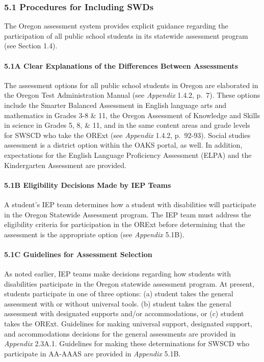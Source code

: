 \documentclass[]{article}
\let\oldparagraph\paragraph
\renewcommand{\paragraph}[1]{\oldparagraph{#1}\mbox{}}
\begin{document}
\subsubsection{5.1 Procedures for Including
SWDs}\label{procedures-for-including-swds}

The Oregon assessment system provides explicit guidance regarding the
participation of all public school students in its statewide assessment
program (see Section 1.4).

\paragraph{5.1A Clear Explanations of the Differences Between
Assessments}\label{a-clear-explanations-of-the-differences-between-assessments}

The assessment options for all public school students in Oregon are
elaborated in the Oregon Test Administration Manual (see \emph{Appendix}
1.4.2, p.~7). These options include the Smarter Balanced Assessment in
English language arts and mathematics in Grades 3-8 \& 11, the Oregon
Assessment of Knowledge and Skills in science in Grades 5, 8, \& 11, and
in the same content areas and grade levels for SWSCD who take the ORExt
(see \emph{Appendix} 1.4.2, p.~92-93). Social studies assessment is a
district option within the OAKS portal, as well. In addition,
expectations for the English Language Proficiency Assessment (ELPA) and
the Kindergarten Assessment are provided.

\paragraph{5.1B Eligibility Decisions Made by IEP
Teams}\label{b-eligibility-decisions-made-by-iep-teams}

A student's IEP team determines how a student with disabilities will
participate in the Oregon Statewide Assessment program. The IEP team
must address the eligibility criteria for participation in the ORExt
before determining that the assessment is the appropriate option (see
\emph{Appendix} 5.1B).

\paragraph{5.1C Guidelines for Assessment
Selection}\label{c-guidelines-for-assessment-selection}

As noted earlier, IEP teams make decisions regarding how students with
disabilities participate in the Oregon statewide assessment program. At
present, students participate in one of three options: (a) student takes
the general assessment with or without universal tools. (b) student
takes the general assessment with designated supports and/or
accommodations, or (c) student takes the ORExt. Guidelines for making
universal support, designated support, and accommodations decisions for
the general assessments are provided in \emph{Appendix} 2.3A.1.
Guidelines for making these determinations for SWSCD who participate in
AA-AAAS are provided in \emph{Appendix} 5.1B.
\end{document}
